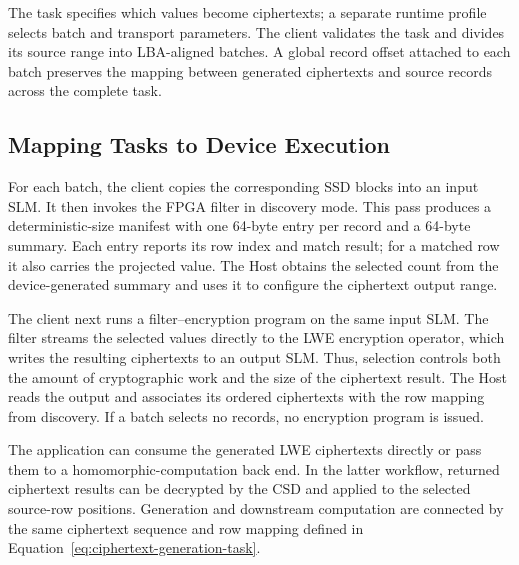 The task specifies which values become ciphertexts; a separate runtime profile selects batch and transport parameters. The client validates the task and divides its source range into LBA-aligned batches. A global record offset attached to each batch preserves the mapping between generated ciphertexts and source records across the complete task.

\subsection{Mapping Tasks to Device Execution}
\label{subsec:cipherstore-execution}

For each batch, the client copies the corresponding SSD blocks into an input SLM. It then invokes the FPGA filter in discovery mode. This pass produces a deterministic-size manifest with one 64-byte entry per record and a 64-byte summary. Each entry reports its row index and match result; for a matched row it also carries the projected value. The Host obtains the selected count from the device-generated summary and uses it to configure the ciphertext output range.

The client next runs a filter--encryption program on the same input SLM. The filter streams the selected values directly to the LWE encryption operator, which writes the resulting ciphertexts to an output SLM. Thus, selection controls both the amount of cryptographic work and the size of the ciphertext result. The Host reads the output and associates its ordered ciphertexts with the row mapping from discovery. If a batch selects no records, no encryption program is issued.

The application can consume the generated LWE ciphertexts directly or pass them to a homomorphic-computation back end. In the latter workflow, returned ciphertext results can be decrypted by the CSD and applied to the selected source-row positions. Generation and downstream computation are connected by the same ciphertext sequence and row mapping defined in Equation~\eqref{eq:ciphertext-generation-task}.

